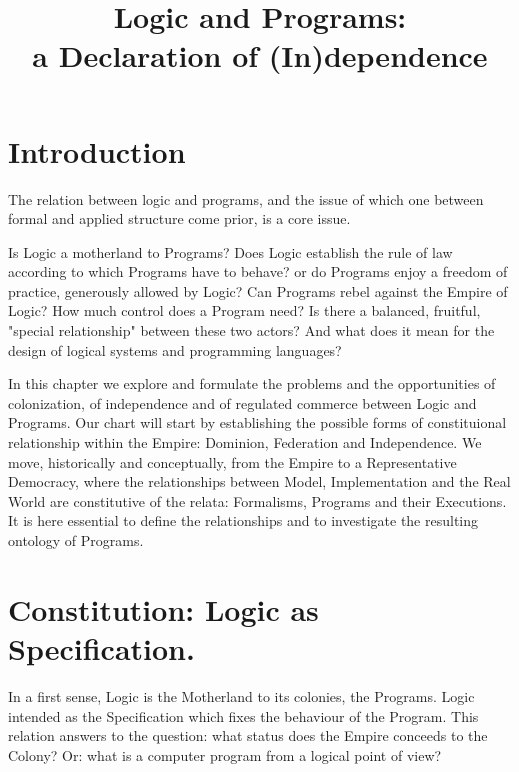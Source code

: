 \documentclass[]{article}
\title{Logic and Programs:\\
	 a Declaration of (In)dependence}
\author{}
\date{}
\begin{document}
\tableofcontents
\maketitle


%



\section{Introduction}

The relation between logic and programs, and the issue of which one between formal and applied structure come prior, is a core issue. 

Is Logic a motherland to Programs? Does Logic establish the rule of law according to which Programs have to behave? or do Programs enjoy a freedom of practice, generously allowed by Logic? Can Programs rebel against the Empire of Logic? How much control does a Program need? Is there a balanced, fruitful, "special relationship" between these two actors? And what does it mean for the design of logical systems and programming languages?

In this chapter we explore and formulate the problems and the opportunities of colonization, of independence and of regulated commerce between Logic and Programs. Our chart will start by establishing the possible forms of constituional relationship within the Empire: Dominion, Federation and Independence. We move, historically and conceptually, from the Empire to a Representative Democracy, where the relationships between Model, Implementation and the Real World are constitutive of the relata: Formalisms, Programs and their Executions. It is here essential to define the relationships and to investigate the resulting ontology of Programs. 


\section{Constitution: Logic as Specification.}

In a first sense, Logic is the Motherland to its colonies, the Programs. Logic intended as the Specification which fixes the behaviour of the Program. This relation answers to the question: what status does the Empire conceeds to the Colony? Or: what is a computer program from a logical point of view?
\end{document}
